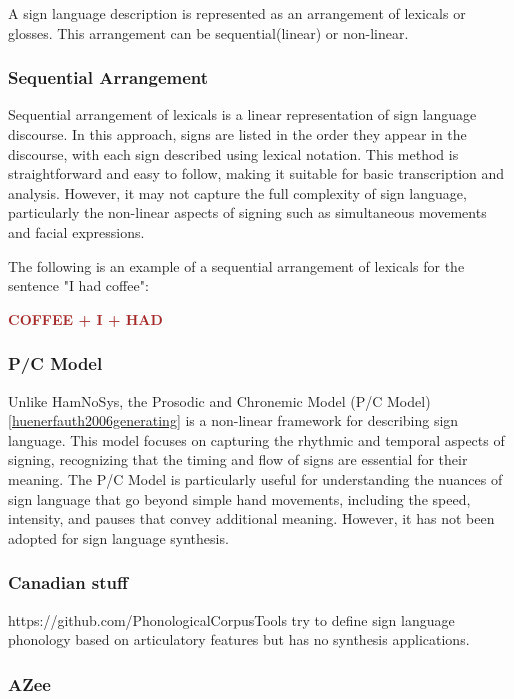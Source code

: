 \documentclass[../../main.tex]{subfiles}
\begin{document}
A sign language description is represented as an arrangement of lexicals or glosses. This arrangement can be sequential(linear) or non-linear.

\subsubsection{Sequential Arrangement}

Sequential arrangement of lexicals is a linear representation of sign language discourse. In this approach, signs are listed in the order they appear in the discourse, with each sign described using lexical notation. This method is straightforward and easy to follow, making it suitable for basic transcription and analysis. However, it may not capture the full complexity of sign language, particularly the non-linear aspects of signing such as simultaneous movements and facial expressions.

The following is an example of a sequential arrangement of lexicals for the sentence "I had coffee":
\begin{center}
  \textcolor{brown}{\textbf{COFFEE + I + HAD}}
\end{center}

\subsubsection{P/C Model}

Unlike HamNoSys, the Prosodic and Chronemic Model (P/C Model) \ref{huenerfauth2006generating} is a non-linear framework for describing sign language. This model focuses on capturing the rhythmic and temporal aspects of signing, recognizing that the timing and flow of signs are essential for their meaning. The P/C Model is particularly useful for understanding the nuances of sign language that go beyond simple hand movements, including the speed, intensity, and pauses that convey additional meaning. However, it has not been adopted for sign language synthesis.

\subsubsection{Canadian stuff}

https://github.com/PhonologicalCorpusTools try to define sign language phonology based on articulatory features but has no synthesis applications.

\subsubsection{AZee}
\end{document}
